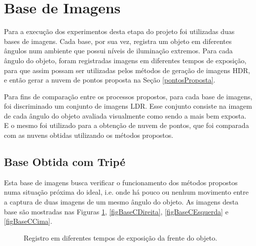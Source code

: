 \section{Base de Imagens} \label{pontosBaseImg}

Para a execução dos experimentos desta etapa do projeto foi utilizadas duas bases de imagens. Cada base, por sua vez, registra um objeto em diferentes ângulos num ambiente que possui níveis de iluminação extremos. Para cada ângulo do objeto, foram registradas imagens em diferentes tempos de exposição, para que assim possam ser utilizadas pelos métodos de geração de imagens HDR, e então gerar a nuvem de pontos proposta na Seção \ref{pontosProposta}.

Para fins de comparação entre os processos propostos, para cada base de imagens, foi discriminado um conjunto de imagens LDR. Esse conjunto consiste na imagem de cada ângulo do objeto avaliada visualmente como sendo a mais bem exposta. E o mesmo foi utilizado para a obtenção de nuvem de pontos, que foi comparada com as nuvens obtidas utilizando os métodos propostos.

\subsection{Base Obtida com Tripé} \label{pontosBControl}
Esta base de imagens busca verificar o funcionamento dos métodos propostos numa situação próxima do ideal, i.e. onde há pouco ou nenhum movimento entre a captura de duas imagens de um mesmo ângulo do objeto. As imagens desta base são mostradas nas Figuras \ref{figBaseCFrente}, \ref{figBaseCDireita}, \ref{figBaseCEsquerda} e \ref{figBaseCCima}.

\begin{figure}[H]
  \centering 
  \quad %
  \quad %
  \quad %
  \caption{Registro em diferentes tempos de exposição da frente do objeto.}
  \label{figBaseCFrente}
\end{figure}

